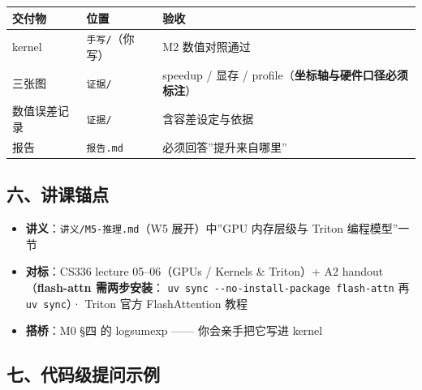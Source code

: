 \documentclass[
  chinese,
  11pt,
]{ctexart}
\newcounter{none} %
\providecommand{\tightlist}{%
  \setlength{\itemsep}{0pt}\setlength{\parskip}{0pt}}
\begin{document}
{\def\LTcaptype{none} %
\begin{longtable}[]{@{}
  >{\raggedright\arraybackslash}p{}
  >{\raggedright\arraybackslash}p{}
  >{\raggedright\arraybackslash}p{}@{}}
\toprule\noalign{}
\begin{minipage}[b]{\linewidth}\raggedright
交付物
\end{minipage} & \begin{minipage}[b]{\linewidth}\raggedright
位置
\end{minipage} & \begin{minipage}[b]{\linewidth}\raggedright
验收
\end{minipage} \\
\midrule\noalign{}
\endhead
\bottomrule\noalign{}
\endlastfoot
kernel & \texttt{手写/}（你写） & M2 数值对照通过 \\
三张图 & \texttt{证据/} & speedup / 显存 / profile（\textbf{坐标轴与硬件口径必须标注}） \\
数值误差记录 & \texttt{证据/} & 含容差设定与依据 \\
报告 & \texttt{报告.md} & 必须回答''提升来自哪里'' \\
\end{longtable}
}

\subsection{六、讲课锚点}\label{ux516dux8bb2ux8bfeux951aux70b9-2}

\begin{itemize}
\tightlist
\item
  \textbf{讲义}：\texttt{讲义/M5-推理.md}（W5 展开）中''GPU 内存层级与 Triton 编程模型''一节
\item
  \textbf{对标}：CS336 lecture 05--06（GPUs / Kernels \& Triton）+ A2 handout（\textbf{flash-attn 需两步安装}： \texttt{uv\ sync\ -\/-no-install-package\ flash-attn} 再 \texttt{uv\ sync}）· Triton 官方 FlashAttention 教程
\item
  \textbf{搭桥}：M0 §四 的 logsumexp ------ 你会亲手把它写进 kernel
\end{itemize}

\subsection{七、代码级提问示例}\label{ux4e03ux4ee3ux7801ux7ea7ux63d0ux95eeux793aux4f8b-2}
\end{document}
